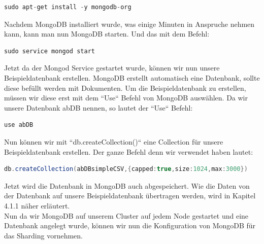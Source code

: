 \begin{lstlisting}[caption={Installation von MongoDB}, language=java,captionpos=t,numbers=none, numberstyle=\tiny,basicstyle=\scriptsize,breaklines=true]
sudo apt-get install -y mongodb-org
\end{lstlisting}

Nachdem MongoDB installiert wurde, was einige Minuten in Anspruche nehmen kann, kann man nun MongoDB starten. Und das mit dem Befehl: 

\begin{lstlisting}[caption={Starten von MongoDB}, language=java,captionpos=t,numbers=none, numberstyle=\tiny,basicstyle=\scriptsize,breaklines=true]
sudo service mongod start
\end{lstlisting}

Jetzt da der Mongod Service gestartet wurde, k\"onnen wir nun unsere Beispieldatenbank erstellen. MongoDB erstellt automatisch eine Datenbank, sollte diese bef\"ullt werden mit Dokumenten. Um die Beispieldatenbank zu erstellen, m\"ussen wir diese erst mit dem “Use“ Befehl von MongoDB ausw\"ahlen. Da wir unsere Datenbank abDB nennen, so lautet der “Use“ Befehl:
\begin{lstlisting}[caption={Auswahl der Datenbank}, language=java,captionpos=t,numbers=none, numberstyle=\tiny,basicstyle=\scriptsize,breaklines=true]
use abDB
\end{lstlisting}
Nun k\"onnen wir mit ``db.createCollection()`` eine Collection f\"ur unsere Beispieldatenbank erstellen. Der ganze Befehl denn wir verwendet haben lautet:
\begin{lstlisting}[caption={Erstellung einer Collection}, language=java,captionpos=t,numbers=none, numberstyle=\tiny,basicstyle=\scriptsize,breaklines=true]
db.createCollection(abDBsimpleCSV,{capped:true,size:1024,max:3000})
\end{lstlisting}
Jetzt wird die Datenbank in MongoDB auch abgespeichert. Wie die Daten von der Datenbank auf unsere Beispieldatenbank \"ubertragen werden, wird in Kapitel 4.1.1 n\"aher erl\"autert.
\\
Nun da wir MongoDB auf unserem Cluster auf jedem Node gestartet und eine Datenbank angelegt wurde, k\"onnen wir nun die Konfiguration von MongoDB f\"ur das Sharding vornehmen.\cite{mongo01}
